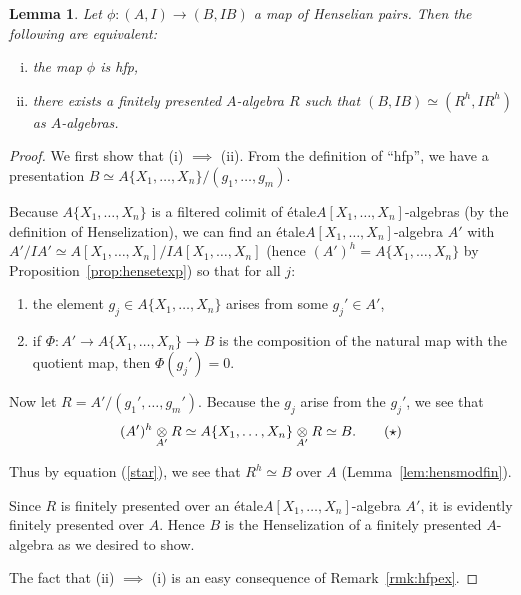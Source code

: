 \documentclass[12pt]{article}
\newcommand{\Et}{\'etale\xspace}
\newcommand{\hfp}{hfp\xspace}
\newtheorem{lemma}[theorem]{Lemma}
\theoremstyle{definition}
\numberwithin{equation}{subsection}
\begin{document}
\begin{lemma}\label{lem:hfpishoffp} Let $\phi: (A,I) \to (B,IB)$ a map of Henselian pairs. Then the following are equivalent: 
\begin{enumerate}[(i)]
\item the map $\phi$ is \hfp,
\item there exists a finitely presented $A$-algebra $R$ such that $(B,IB) \simeq (R^h,IR^h)$ as $A$-algebras.\end{enumerate}
\end{lemma}
\begin{proof} 

We first show that (i) $\implies$ (ii). From the definition of ``\hfp'', we have a presentation $B \simeq A\{X_1,\dots,X_n\}/(g_1,\dots,g_m)$. 

Because $A\{X_1,\dots,X_n\}$ is a filtered colimit of \Et $A[X_1,\dots,X_n]$-algebras (by the definition of Henselization), we can find an \Et $A[X_1,\dots,X_n]$-algebra $A'$ with $A'/IA' \simeq A[X_1,\dots,X_n]/IA[X_1,\dots,X_n] $ (hence $(A')^h = A\{X_1,\dots,X_n\}$ by Proposition~\ref{prop:hensetexp}) so that for all $j$:
\begin{enumerate}[\hspace{2ex}(a)]
\item the element $g_j \in A\{X_1,\dots,X_n\}$ arises from some $g_j' \in A'$,
\item if $\Phi: A' \to A\{X_1,\dots,X_n\} \to B$ is the composition of the natural map with the quotient map, then $\Phi(g_j')=0$. 
\end{enumerate}


Now let $R=A'/(g_1',\dots,g_m')$. Because the $g_j$ arise from the $g_j'$, we see that \begin{equation}\label{star}(A')^h \tens_{A'} R \simeq A\{X_1,\dots,X_n\} \tens_{A'} R \simeq B.\tag{$\star$}\end{equation}

Thus by equation (\ref{star}), we see that $R^h \simeq B$ over $A$ (Lemma~\ref{lem:hensmodfin}).

Since $R$ is finitely presented over an \Et $A[X_1,\dots,X_n]$-algebra $A'$, it is evidently finitely presented over $A$. Hence $B$ is the Henselization of a finitely presented $A$-algebra as we desired to show. 

The fact that (ii) $\implies$ (i) is an easy consequence of Remark~\ref{rmk:hfpex}. \end{proof}
\end{document}
